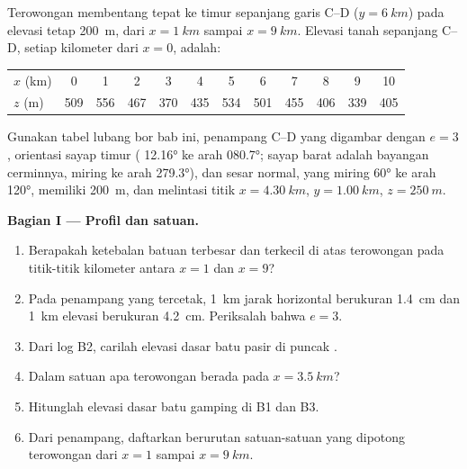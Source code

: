 \begin{problem}
\label{pb:b1:cross-sections:1}
Terowongan membentang tepat ke timur sepanjang garis C--D ($y = \qty{6}{km}$) pada elevasi tetap \qty{200}{m}, dari $x = \qty{1}{km}$ sampai $x =
\qty{9}{km}$. Elevasi tanah sepanjang C--D, setiap kilometer dari $x = 0$, adalah:
\begin{center}
\small
\begin{tabular}{lccccccccccc}
\hline
$x$ (km) & 0 & 1 & 2 & 3 & 4 & 5 & 6 & 7 & 8 & 9 & 10 \\
$z$ (m) & 509 & 556 & 467 & 370 & 435 & 534 & 501 & 455 & 406 & 339 & 405 \\
\hline
\end{tabular}
\end{center}
Gunakan tabel lubang bor bab ini, penampang C--D yang digambar dengan $e = 3$, orientasi sayap timur ( \ang{12.16} ke arah \ang{080.7}; sayap barat adalah bayangan cerminnya, miring ke arah \ang{279.3}), dan sesar normal, yang miring \ang{60} ke arah \ang{120}, memiliki  \qty{200}{m}, dan melintasi titik $x = \qty{4.30}{km}$, $y = \qty{1.00}{km}$, $z = \qty{250}{m}$.

\medskip
\noindent\textbf{Bagian I --- Profil dan satuan.}
\begin{enumerate}
  \item Berapakah ketebalan batuan terbesar dan terkecil di atas terowongan pada titik-titik kilometer antara $x = 1$ dan $x = 9$?
  \item Pada penampang yang tercetak, \qty{1}{km} jarak horizontal berukuran \qty{1.4}{cm} dan \qty{1}{km} elevasi berukuran \qty{4.2}{cm}. Periksalah bahwa $e = 3$.
  \item Dari log B2, carilah elevasi dasar batu pasir di puncak .
  \item Dalam satuan apa terowongan berada pada $x = \qty{3.5}{km}$?
  \item Hitunglah elevasi dasar batu gamping di B1 dan B3.
  \item Dari penampang, daftarkan berurutan satuan-satuan yang dipotong terowongan dari $x = 1$ sampai $x = \qty{9}{km}$.
\end{enumerate}


\end{problem}
